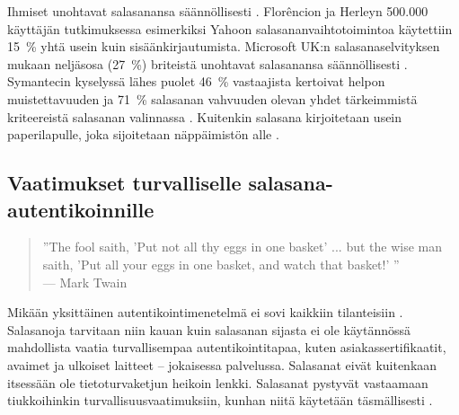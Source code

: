 \documentclass{tktltiki}
\begin{document}
Ihmiset unohtavat salasanansa säännöllisesti \cite{ponemon_pw_survey_06, password_management_strategies_06}. Florêncion ja Herleyn 500.000 käyttäjän tutkimuksessa \cite{study_of_passwords_07} esimerkiksi Yahoon salasananvaihtotoimintoa käytettiin 15~\% yhtä usein kuin sisäänkirjautumista. Microsoft UK:n salasanaselvityksen mukaan neljäsosa (27~\%) briteistä unohtavat salasanansa säännöllisesti \cite{microsoft_pw_survey_04}. Symantecin kyselyssä lähes puolet 46~\% vastaajista kertoivat helpon muistettavuuden ja 71~\% salasanan vahvuuden olevan yhdet tärkeimmistä kriteereistä salasanan valinnassa \cite{symantec_pw_survey_10}. Kuitenkin salasana kirjoitetaan usein paperilapulle, joka sijoitetaan näppäimistön alle \cite{pw_auth_system_perspective_08}.



\subsection{Vaatimukset turvalliselle salasana-autentikoinnille}

  \begin{quote}
      ''The fool saith, 'Put not all thy eggs in one basket' ... 
      but the wise man saith, 'Put all your eggs in one basket, and watch that basket!' ''
      \\--- Mark Twain \cite{twain_eggs_1894}
  \end {quote}

Mikään yksittäinen autentikointimenetelmä ei sovi kaikkiin tilanteisiin \cite{will_we_ever_escape_passwords_05}.
Salasanoja tarvitaan niin kauan kuin salasanan sijasta ei ole käytännössä mahdollista vaatia turvallisempaa autentikointitapaa, kuten asiakassertifikaatit, avaimet ja ulkoiset laitteet -- jokaisessa palvelussa.
Salasanat eivät kuitenkaan itsessään ole tietoturvaketjun heikoin lenkki. Salasanat pystyvät vastaamaan tiukkoihinkin turvallisuusvaatimuksiin, kunhan niitä käytetään täsmällisesti \cite{will_we_ever_escape_passwords_05}.
\end{document}
